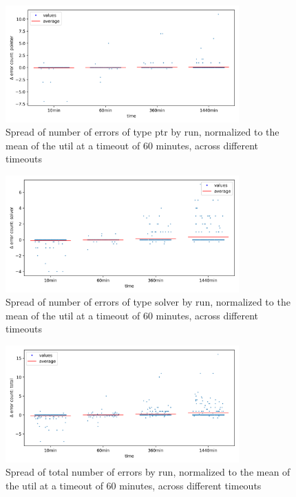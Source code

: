 \documentclass{article}
\begin{document}
\begin{figure}[htbp]
    \centering
    \includegraphics[width=0.8\textwidth]{../plots/num_errors (ptr)/changes-by-time.png}
    \captionsetup{width=0.6\textwidth}
    \caption{Spread of number of errors of type ptr by run, normalized to the mean of the util at a timeout of 60 minutes, across different timeouts}
\end{figure}
\begin{figure}[htbp]
    \centering
    \includegraphics[width=0.8\textwidth]{../plots/num_errors (solver)/changes-by-time.png}
    \captionsetup{width=0.6\textwidth}
    \caption{Spread of number of errors of type solver by run, normalized to the mean of the util at a timeout of 60 minutes, across different timeouts}
\end{figure}
\begin{figure}[htbp]
    \centering
    \includegraphics[width=0.8\textwidth]{../plots/num_errors (total)/changes-by-time.png}
    \captionsetup{width=0.6\textwidth}
    \caption{Spread of total number of errors by run, normalized to the mean of the util at a timeout of 60 minutes, across different timeouts}
\end{figure}
\end{document}
